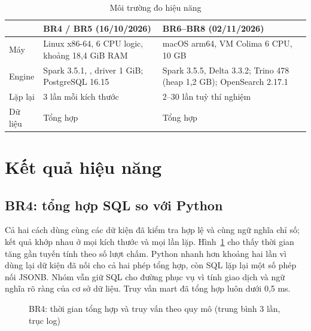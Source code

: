 \begin{table}[H]
\centering\small
\caption{Môi trường đo hiệu năng}\label{tab:env}
\begin{tabularx}{\textwidth}{@{}L{2.6cm}YY@{}}
\toprule
& \textbf{BR4 / BR5 (16/10/2026)} & \textbf{BR6--BR8 (02/11/2026)} \\
\midrule
Máy & Linux x86-64, 6 CPU logic, khoảng 18,4 GiB RAM & macOS arm64, VM Colima 6 CPU, 10 GB \\
Engine & Spark 3.5.1, , driver 1 GiB; PostgreSQL 16.15 & Spark 3.5.5, Delta 3.3.2; Trino 478 (heap 1,2 GB); OpenSearch 2.17.1 \\
Lặp lại & 3 lần mỗi kích thước & 2--30 lần tuỳ thí nghiệm \\
Dữ liệu & Tổng hợp & Tổng hợp \\
\bottomrule
\end{tabularx}
\end{table}

\section{Kết quả hiệu năng}

\subsection{BR4: tổng hợp SQL so với Python}

Cả hai cách dùng cùng các dữ kiện đã kiểm tra hợp lệ và cùng ngữ nghĩa chỉ số; kết quả khớp nhau ở mọi kích thước và mọi lần lặp. Hình~\ref{fig:br4} cho thấy thời gian tăng gần tuyến tính theo số lượt chấm. Python nhanh hơn khoảng hai lần vì dùng lại dữ kiện đã nối cho cả hai phép tổng hợp, còn SQL lặp lại một số phép nối JSONB. Nhóm vẫn giữ SQL cho đường phục vụ vì tính giao dịch và ngữ nghĩa rõ ràng của cơ sở dữ liệu. Truy vấn mart đã tổng hợp luôn dưới 0,5 ms.

\begin{figure}[H]
\centering
{}
\caption{BR4: thời gian tổng hợp và truy vấn theo quy mô (trung bình 3 lần, trục log)}
\label{fig:br4}
\end{figure}

